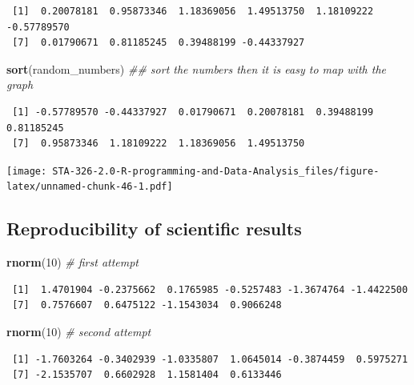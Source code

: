 \documentclass[
]{book}
\newenvironment{Shaded}{\begin{snugshade}}{\end{snugshade}}
\newcommand{\CommentTok}[1]{\textcolor[rgb]{0.56,0.35,0.01}{\textit{#1}}}
\newcommand{\DecValTok}[1]{\textcolor[rgb]{0.00,0.00,0.81}{#1}}
\newcommand{\KeywordTok}[1]{\textcolor[rgb]{0.13,0.29,0.53}{\textbf{#1}}}
\newcommand{\NormalTok}[1]{#1}
\begin{document}
\begin{verbatim}
 [1]  0.20078181  0.95873346  1.18369056  1.49513750  1.18109222 -0.57789570
 [7]  0.01790671  0.81185245  0.39488199 -0.44337927
\end{verbatim}

\begin{Shaded}
\begin{Highlighting}[]
\KeywordTok{sort}\NormalTok{(random_numbers) }\CommentTok{## sort the numbers then it is easy to map with the graph}
\end{Highlighting}
\end{Shaded}

\begin{verbatim}
 [1] -0.57789570 -0.44337927  0.01790671  0.20078181  0.39488199  0.81185245
 [7]  0.95873346  1.18109222  1.18369056  1.49513750
\end{verbatim}

\texttt{[image: STA-326-2.0-R-programming-and-Data-Analysis\_files/figure-latex/unnamed-chunk-46-1.pdf]}

\hypertarget{reproducibility-of-scientific-results}{%
\subsection{Reproducibility of scientific results}\label{reproducibility-of-scientific-results}}

\begin{Shaded}
\begin{Highlighting}[]
\KeywordTok{rnorm}\NormalTok{(}\DecValTok{10}\NormalTok{) }\CommentTok{# first attempt}
\end{Highlighting}
\end{Shaded}

\begin{verbatim}
 [1]  1.4701904 -0.2375662  0.1765985 -0.5257483 -1.3674764 -1.4422500
 [7]  0.7576607  0.6475122 -1.1543034  0.9066248
\end{verbatim}

\begin{Shaded}
\begin{Highlighting}[]
\KeywordTok{rnorm}\NormalTok{(}\DecValTok{10}\NormalTok{) }\CommentTok{# second attempt}
\end{Highlighting}
\end{Shaded}

\begin{verbatim}
 [1] -1.7603264 -0.3402939 -1.0335807  1.0645014 -0.3874459  0.5975271
 [7] -2.1535707  0.6602928  1.1581404  0.6133446
\end{verbatim}
\end{document}
